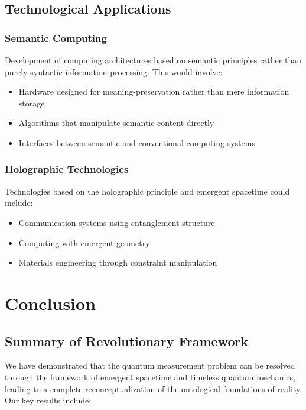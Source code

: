 \documentclass[12pt,a4paper]{article}
\begin{document}
\subsection{Technological Applications}

\subsubsection{Semantic Computing}

Development of computing architectures based on semantic principles rather than purely syntactic information processing. This would involve:

\begin{itemize}
    \item Hardware designed for meaning-preservation rather than mere information storage
    \item Algorithms that manipulate semantic content directly
    \item Interfaces between semantic and conventional computing systems
\end{itemize}

\subsubsection{Holographic Technologies}

Technologies based on the holographic principle and emergent spacetime could include:

\begin{itemize}
    \item Communication systems using entanglement structure
    \item Computing with emergent geometry
    \item Materials engineering through constraint manipulation
\end{itemize}

\section{Conclusion}

\subsection{Summary of Revolutionary Framework}

We have demonstrated that the quantum measurement problem can be resolved through the framework of emergent spacetime and timeless quantum mechanics, leading to a complete reconceptualization of the ontological foundations of reality. Our key results include:
\end{document}
